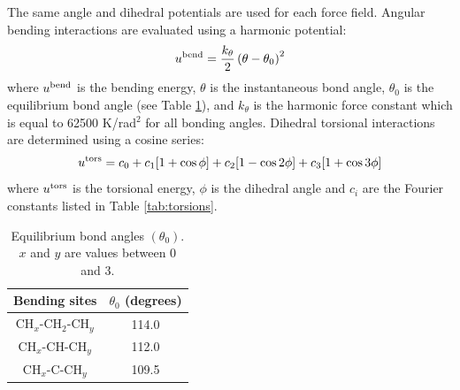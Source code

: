 \documentclass[preprint,review,12pt]{elsarticle}
\begin{document}
    
    
    The same angle and dihedral potentials are used for each force field. Angular bending interactions are evaluated using a harmonic potential:
	\begin{equation}
	u^{\rm bend} = \frac{k_\theta}{2} \left(\theta-\theta_0\right)^2
	\end{equation}
	where $u^{\rm bend}$ is the bending energy, $\theta$ is the instantaneous bond angle, $\theta_0$ is the equilibrium bond angle (see Table \ref{tab:angles}), and $k_\theta$ is the harmonic force constant which is equal to 62500 K/rad$^2$ for all bonding angles. Dihedral torsional interactions are determined using a cosine series:
	\begin{equation}
	u^{\rm tors} = c_0 + c_1 [1+\cos{\phi}] + c_2 [1-\cos{2\phi}] + c_3 [1+\cos{3\phi}]
	\end{equation}
	where $u^{\rm tors}$ is the torsional energy, $\phi$ is the dihedral angle and $c_i$ are the Fourier constants listed in Table \ref{tab:torsions}. 
	\begin{table}[h!]
		\caption{Equilibrium bond angles $(\theta_0)$. $x$ and $y$ are values between 0 and 3.} \label{tab:angles}
		\begin{center}
			\begin{tabular}{|c|c|}
				\hline
				Bending sites & $\theta_0$ (degrees) \\ \hline
				CH$_x$-CH$_2$-CH$_y$ & 114.0 \\ 
				CH$_x$-CH-CH$_y$ & 112.0 \\ 
				CH$_x$-C-CH$_y$ & 109.5 \\  
				\hline
			\end{tabular}
		\end{center} 
	\end{table}
	
\end{document}
